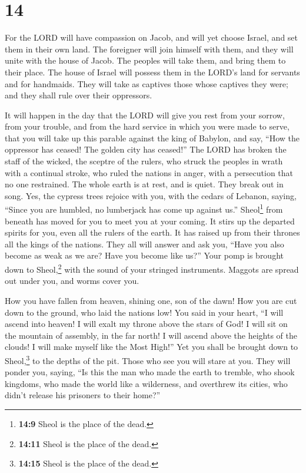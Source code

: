 \hypertarget{section-13}{%
\section{14}\label{section-13}}

 For the LORD will have compassion on Jacob, and will yet
choose Israel, and set them in their own land. The foreigner will join
himself with them, and they will unite with the house of Jacob.
 The peoples will take them, and bring them to their
place. The house of Israel will possess them in the LORD's land for
servants and for handmaids. They will take as captives those whose
captives they were; and they shall rule over their oppressors.

 It will happen in the day that the LORD will give you
rest from your sorrow, from your trouble, and from the hard service in
which you were made to serve,  that you will take up this
parable against the king of Babylon, and say, ``How the oppressor has
ceased! The golden city has ceased!''  The LORD has broken
the staff of the wicked, the sceptre of the rulers,  who
struck the peoples in wrath with a continual stroke, who ruled the
nations in anger, with a persecution that no one restrained.
 The whole earth is at rest, and is quiet. They break out
in song.  Yes, the cypress trees rejoice with you, with
the cedars of Lebanon, saying, ``Since you are humbled, no lumberjack
has come up against us.''  Sheol\footnote{\textbf{14:9}
  Sheol is the place of the dead.} from beneath has moved for you to
meet you at your coming. It stirs up the departed spirits for you, even
all the rulers of the earth. It has raised up from their thrones all the
kings of the nations.  They all will answer and ask you,
``Have you also become as weak as we are? Have you become like us?''
 Your pomp is brought down to Sheol,\footnote{\textbf{14:11}
  Sheol is the place of the dead.} with the sound of your stringed
instruments. Maggots are spread out under you, and worms cover you.

 How you have fallen from heaven, shining one, son of the
dawn! How you are cut down to the ground, who laid the nations low!
 You said in your heart, ``I will ascend into heaven! I
will exalt my throne above the stars of God! I will sit on the mountain
of assembly, in the far north!  I will ascend above the
heights of the clouds! I will make myself like the Most High!''
 Yet you shall be brought down to Sheol,\footnote{\textbf{14:15}
  Sheol is the place of the dead.} to the depths of the pit.
 Those who see you will stare at you. They will ponder
you, saying, ``Is this the man who made the earth to tremble, who shook
kingdoms,  who made the world like a wilderness, and
overthrew its cities, who didn't release his prisoners to their home?''

